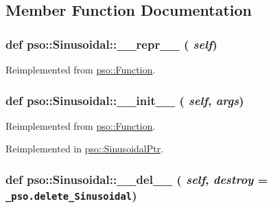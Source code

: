 \subsection{Member Function Documentation}
\hypertarget{classpso_1_1Sinusoidal_b6343711af3f82150f169132f230fd80}{
\subsubsection{\setlength{\rightskip}{0pt plus 5cm}def pso::Sinusoidal::\_\-\_\-repr\_\-\_\- ( {\em self})}}
\label{classpso_1_1Sinusoidal_b6343711af3f82150f169132f230fd80}




Reimplemented from \hyperlink{classpso_1_1Function_959f07a6de4f333461fdb0261e6c25ae}{pso::Function}.\hypertarget{classpso_1_1Sinusoidal_a75df3138290d6798a97d2ffe7b1c68b}{
\subsubsection{\setlength{\rightskip}{0pt plus 5cm}def pso::Sinusoidal::\_\-\_\-init\_\-\_\- ( {\em self}, \/   {\em args})}}
\label{classpso_1_1Sinusoidal_a75df3138290d6798a97d2ffe7b1c68b}




Reimplemented from \hyperlink{classpso_1_1Function_6874097c6476dc85af64b40e76a807e9}{pso::Function}.

Reimplemented in \hyperlink{classpso_1_1SinusoidalPtr_086a4ea046d5a57f475e3e37952d976a}{pso::SinusoidalPtr}.\hypertarget{classpso_1_1Sinusoidal_8b3ba4783d55a0536cfde0c74c1a8e6e}{
\subsubsection{\setlength{\rightskip}{0pt plus 5cm}def pso::Sinusoidal::\_\-\_\-del\_\-\_\- ( {\em self}, \/   {\em destroy} = {\tt \_\-pso.delete\_\-Sinusoidal})}}
\label{classpso_1_1Sinusoidal_8b3ba4783d55a0536cfde0c74c1a8e6e}




